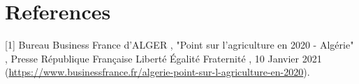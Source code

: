\chapter*{References} 
\label{chap:reference} 
[1] Bureau Business France d'ALGER , "Point sur l'agriculture en 2020 - Algérie" , Presse République Française Liberté Égalité Fraternité , 10 Janvier 2021 (\url {https://www.businessfrance.fr/algerie-point-sur-l-agriculture-en-2020}).